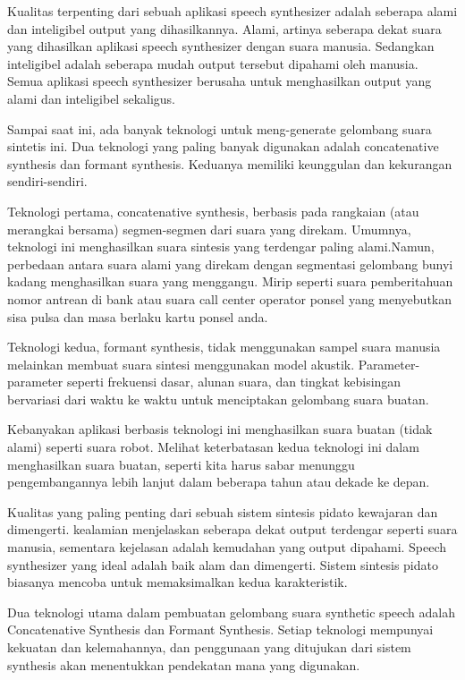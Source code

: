 Kualitas terpenting dari sebuah aplikasi speech synthesizer adalah seberapa alami dan inteligibel output yang dihasilkannya. Alami, artinya seberapa dekat suara yang dihasilkan aplikasi speech synthesizer dengan suara manusia. Sedangkan inteligibel adalah seberapa mudah output tersebut dipahami oleh manusia. Semua aplikasi speech synthesizer berusaha untuk menghasilkan output yang alami dan inteligibel sekaligus.

Sampai saat ini, ada banyak teknologi untuk meng-generate gelombang suara sintetis ini. Dua teknologi yang paling banyak digunakan adalah concatenative synthesis\cite{Hunt1996UnitSI} dan formant synthesis. Keduanya memiliki keunggulan dan kekurangan sendiri-sendiri.

Teknologi pertama, concatenative synthesis\cite{Hunt1996UnitSI}, berbasis pada rangkaian (atau merangkai bersama) segmen-segmen dari suara yang direkam. Umumnya, teknologi ini menghasilkan suara sintesis yang terdengar paling alami.Namun, perbedaan antara suara alami yang direkam dengan segmentasi gelombang bunyi kadang menghasilkan suara yang menggangu. Mirip seperti suara pemberitahuan nomor antrean di bank atau suara call center operator ponsel yang menyebutkan sisa pulsa dan masa berlaku kartu ponsel anda.

Teknologi kedua, formant synthesis, tidak menggunakan sampel suara manusia melainkan membuat suara sintesi menggunakan model akustik. Parameter-parameter seperti frekuensi dasar, alunan suara, dan tingkat kebisingan bervariasi dari waktu ke waktu untuk menciptakan gelombang suara buatan.

Kebanyakan aplikasi berbasis teknologi ini menghasilkan suara buatan (tidak alami) seperti suara robot. Melihat keterbatasan kedua teknologi ini dalam menghasilkan suara buatan, seperti kita harus sabar menunggu pengembangannya lebih lanjut dalam beberapa tahun atau dekade ke depan.

Kualitas yang paling penting dari sebuah sistem sintesis pidato kewajaran dan dimengerti. kealamian menjelaskan seberapa dekat output terdengar seperti suara manusia, sementara kejelasan adalah kemudahan yang output dipahami. Speech synthesizer yang ideal adalah baik alam dan dimengerti. Sistem sintesis pidato biasanya mencoba untuk memaksimalkan kedua karakteristik.

Dua teknologi utama dalam pembuatan gelombang suara synthetic speech adalah Concatenative Synthesis dan Formant Synthesis. Setiap teknologi mempunyai kekuatan dan kelemahannya, dan penggunaan yang ditujukan dari sistem synthesis akan menentukkan pendekatan mana yang digunakan.

